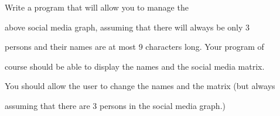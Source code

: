 Write a program that will allow you to manage the

above social media graph, assuming that there will always be only 3

persons and their names are at most 9 characters long. Your program of

course should be able to display the names and the social media matrix.

You should allow the user to change the names and the matrix (but always

assuming that there are 3 persons in the social media graph.)

